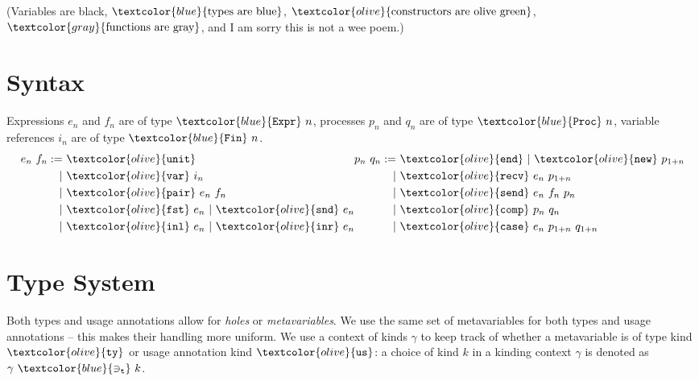 \documentclass[sigplan,screen,review]{acmart}
\newcommand{\constr}[1]{\textcolor{olive}{\mathtt{#1}}}
\newcommand{\func}[1]{\textcolor{gray}{\mathtt{#1}}}
\newcommand{\type}[1]{\textcolor{blue}{\mathtt{#1}}}
\newcommand{\Fin}[1]{\type{Fin}~#1}
\newcommand{\sExpr}[1]{\type{Expr}~#1}
\newcommand{\sProc}[1]{\type{Proc}~#1}
\newcommand{\tvar}[2]{#1 ~\type{\ni_t}~ #2}
\newcommand{\sunit}{\constr{unit}}
\newcommand{\svar}{\constr{var}}
\newcommand{\sfst}{\constr{fst}}
\newcommand{\ssnd}{\constr{snd}}
\newcommand{\sinl}{\constr{inl}}
\newcommand{\sinr}{\constr{inr}}
\newcommand{\spair}{\constr{pair}}
\newcommand{\send}{\constr{end}}
\newcommand{\snew}{\constr{new}}
\newcommand{\scomp}{\constr{comp}}
\newcommand{\srecv}{\constr{recv}}
\newcommand{\ssend}{\constr{send}}
\newcommand{\scase}{\constr{case}}
\newcommand{\ktype}{\constr{ty}}
\newcommand{\kusage}{\constr{us}}
\begin{document}
(Variables are black, $\type{\textrm{types are blue}}$, $\constr{\textrm{constructors are olive green}}$, $\func{\textrm{functions are gray}}$, and I am sorry this is not a wee poem.)


\section{Syntax}\label{syntax}

Expressions $e_n$ and $f_n$ are of type $\sExpr{n}$, processes $p_n$ and $q_n$ are of type $\sProc{n}$, variable references $i_n$ are of type $\Fin{n}$.
\[
\begin{aligned}[c]
  e_n ~ f_n  :=
  &~ \sunit \\
  |&~ \svar~i_n \\
  |&~ \spair~e_n~f_n \\
  |&~ \sfst~e_n ~|~  \ssnd~e_n \\
  |&~ \sinl~e_n ~|~  \sinr~e_n
\end{aligned}
\begin{aligned}[c]
  p_n ~ q_n  :=
  &~ \send ~|~  \snew~p_{1+n} \\
  |&~ \srecv~e_n~p_{1+n} \\
  |&~ \ssend~e_n~f_n~p_n \\
  |&~ \scomp~p_n~q_n \\
  |&~ \scase~e_n~p_{1+n}~q_{1+n}
\end{aligned}
\]

\section{Type System}\label{type-system}

Both types and usage annotations allow for \emph{holes} or \emph{metavariables}.
We use the same set of metavariables for both types and usage annotations -- this makes their handling more uniform.
We use a context of kinds \(\gamma\) to keep track of whether a metavariable is of type kind $\ktype$ or usage annotation kind $\kusage$: a choice of kind \(k\) in a kinding context \(\gamma\) is denoted as $\tvar{\gamma}{k}$.
\end{document}

